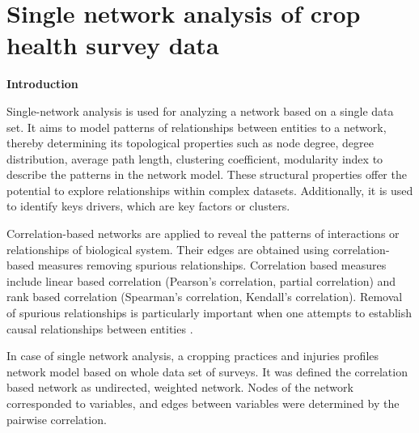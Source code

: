 

\section*{Single network analysis of crop health survey data}
\textbf{Introduction}

Single-network analysis is used for analyzing a network based on a single data set. It aims to model patterns of relationships between entities to a network, thereby determining its topological properties such as node degree, degree distribution, average path length, clustering coefficient, modularity index  to describe the patterns in the network model. These structural properties offer the potential to explore relationships within complex datasets. Additionally, it is used to identify keys drivers, which are key factors or clusters.

Correlation-based networks are applied to reveal the patterns of interactions or relationships of biological system. Their edges are obtained using correlation-based measures removing spurious relationships. Correlation based measures include linear based correlation (Pearson's correlation, partial correlation) and rank based correlation (Spearman's correlation, Kendall's correlation). Removal of spurious relationships is particularly important when one attempts to establish causal relationships between entities .

In case of single network analysis, a cropping practices and injuries profiles network model based on whole data set of surveys. It was defined the correlation based network as undirected, weighted network. Nodes of the network corresponded to variables, and edges between variables were determined by the pairwise correlation.


